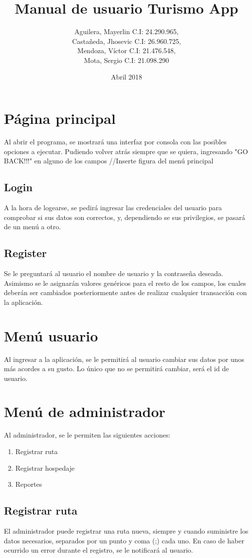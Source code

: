\documentclass{article}
\title{Manual de usuario Turismo App}
\date{Abril 2018}
\author{Aguilera, Mayerlin C.I: 24.290.965,\\
        Castañeda, Jhosevic C.I: 26.960.725, \\
        Mendoza, Víctor C.I: 21.476.548, \\
        Mota, Sergio C.I: 21.098.290}
\begin{document}
\maketitle
\newpage
\tableofcontents
\newpage

\section{Página principal}
Al abrir el programa, se mostrará una interfaz por consola con las posibles opciones a ejecutar. Pudiendo volver atrás siempre que se quiera, ingresando "GO BACK!!!" en alguno de los campos
//Inserte figura del menú principal
\subsection{Login}
A la hora de logearse, se pedirá ingresar las credenciales del usuario para comprobar si sus datos son correctos, y, dependiendo se sus privilegios, se pasará de un menú a otro.

\subsection{Register}
Se le preguntará al usuario el nombre de usuario y la contraseña deseada. Asimismo se le asignarán valores genéricos para el resto de los campos, los cuales deberán ser cambiados posteriormente antes de realizar cualquier transacción con la aplicación.

\section{Menú usuario}
Al ingresar a la aplicación, se le permitirá al usuario cambiar sus datos por unos más acordes a su gusto. Lo único que no se permitirá cambiar, será el id de usuario.

\section{Menú de administrador}
Al administrador, se le permiten las siguientes acciones:
\begin{enumerate}
    \item Registrar ruta
    \item Registrar hospedaje
    \item Reportes
\end{enumerate}

\subsection{Registrar ruta}
El administrador puede registrar una ruta nueva, siempre y cuando suministre los datos necesarios, separados por un punto y coma (;) cada uno.
En caso de haber ocurrido un error durante el registro, se le notificará al usuario.
\end{document}
